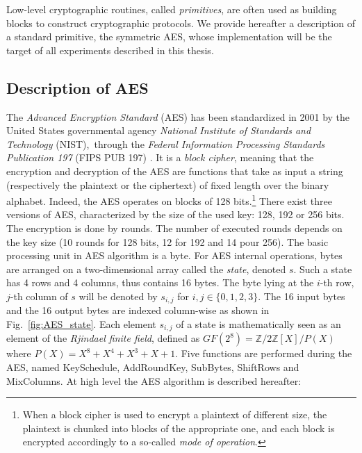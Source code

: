 Low-level cryptographic routines, called \emph{primitives}, are often used as building blocks to construct cryptographic protocols. We provide hereafter a description of a standard primitive, the symmetric AES, whose implementation will be the target of all experiments described in this thesis.

\subsection{Description of AES}
The \emph{Advanced Encryption Standard} (AES) has been standardized in 2001 by the United States governmental agency \emph{National Institute of Standards and Technology} (NIST),\ through the \emph{Federal Information
Processing Standards Publication 197 } (FIPS PUB 197) \cite{nist197}. It is a \emph{block cipher}, meaning that the encryption and decryption of the AES are functions that take as input a string (respectively the plaintext or the ciphertext) of fixed length over the binary alphabet. Indeed, the AES operates on blocks of 128 bits.\footnote{When a block cipher is used to encrypt a plaintext of different size, the plaintext is chunked into blocks of the appropriate one, and each block is encrypted accordingly to a so-called \emph{mode of operation}.} There exist three versions of AES, characterized by the size of the used key: 128, 192 or 256 bits. The encryption is done by rounds. The number of executed rounds depends on the key size (10 rounds for 128 bits, 12 for 192 and 14 pour 256). The basic processing unit in AES algorithm is a byte. For AES internal operations, bytes are arranged on a two-dimensional array called the \emph{state}, denoted $s$. Such a state has 4 rows and 4 columns, thus contains 16 bytes. The byte lying at the $i$-th row, $j$-th column of $s$ will be denoted by $s_{i,j}$ for $i,j\in\{0,1,2,3\}$. The 16 input bytes and the 16 output bytes are indexed column-wise as shown in Fig.~\ref{fig:AES_state}. Each element $s_{i,j}$ of a state is mathematically seen as an element of the \emph{Rjindael finite field}, defined as $GF(2^8) = \mathbb{Z}/{2\mathbb{Z}[X]}/P(X)$ where $P(X) = X^8 + X^4 + X^3 + X + 1$. Five functions are performed during the AES, named KeySchedule, AddRoundKey, SubBytes, ShiftRows and MixColumns. At high level the AES algorithm is described hereafter:

